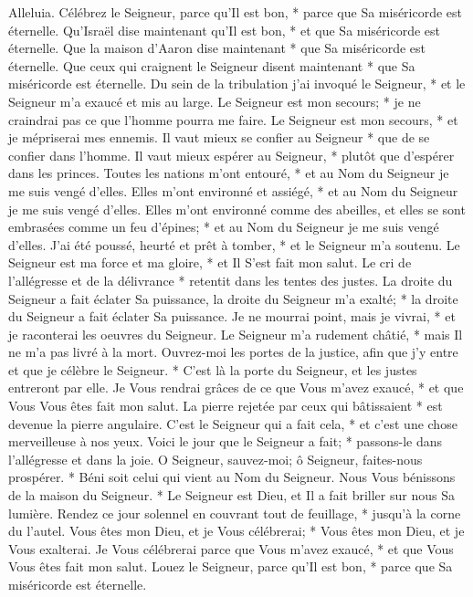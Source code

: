 Alleluia. Célébrez le Seigneur, parce qu'Il est bon, * parce que Sa miséricorde est éternelle.
Qu'Israël dise maintenant qu'Il est bon, * et que Sa miséricorde est éternelle.
Que la maison d'Aaron dise maintenant * que Sa miséricorde est éternelle.
Que ceux qui craignent le Seigneur disent maintenant * que Sa miséricorde est éternelle.
Du sein de la tribulation j'ai invoqué le Seigneur, * et le Seigneur m'a exaucé et mis au large.
Le Seigneur est mon secours; * je ne craindrai pas ce que l'homme pourra me faire.
Le Seigneur est mon secours, * et je mépriserai mes ennemis.
Il vaut mieux se confier au Seigneur * que de se confier dans l'homme.
Il vaut mieux espérer au Seigneur, * plutôt que d'espérer dans les princes.
Toutes les nations m'ont entouré, * et au Nom du Seigneur je me suis vengé d'elles.
Elles m'ont environné et assiégé, * et au Nom du Seigneur je me suis vengé d'elles.
Elles m'ont environné comme des abeilles, et elles se sont embrasées comme un feu d'épines; * et au Nom du Seigneur je me suis vengé d'elles.
J'ai été poussé, heurté et prêt à tomber, * et le Seigneur m'a soutenu.
Le Seigneur est ma force et ma gloire, * et Il S'est fait mon salut.
Le cri de l'allégresse et de la délivrance * retentit dans les tentes des justes.
La droite du Seigneur a fait éclater Sa puissance, la droite du Seigneur m'a exalté; * la droite du Seigneur a fait éclater Sa puissance.
Je ne mourrai point, mais je vivrai, * et je raconterai les oeuvres du Seigneur.
Le Seigneur m'a rudement châtié, * mais Il ne m'a pas livré à la mort.
Ouvrez-moi les portes de la justice, afin que j'y entre et que je célèbre le Seigneur. *
C'est là la porte du Seigneur, et les justes entreront par elle.
Je Vous rendrai grâces de ce que Vous m'avez exaucé, * et que Vous Vous êtes fait mon salut.
La pierre rejetée par ceux qui bâtissaient * est devenue la pierre angulaire.
C'est le Seigneur qui a fait cela, * et c'est une chose merveilleuse à nos yeux.
Voici le jour que le Seigneur a fait; * passons-le dans l'allégresse et dans la joie.
O Seigneur, sauvez-moi; ô Seigneur, faites-nous prospérer. *
Béni soit celui qui vient au Nom du Seigneur. Nous Vous bénissons de la maison du Seigneur. *
Le Seigneur est Dieu, et Il a fait briller sur nous Sa lumière. Rendez ce jour solennel en couvrant tout de feuillage, * jusqu'à la corne du l'autel.
Vous êtes mon Dieu, et je Vous célébrerai; * Vous êtes mon Dieu, et je Vous exalterai. Je Vous célébrerai parce que Vous m'avez exaucé, * et que Vous Vous êtes fait mon salut.
Louez le Seigneur, parce qu'Il est bon, * parce que Sa miséricorde est éternelle.

